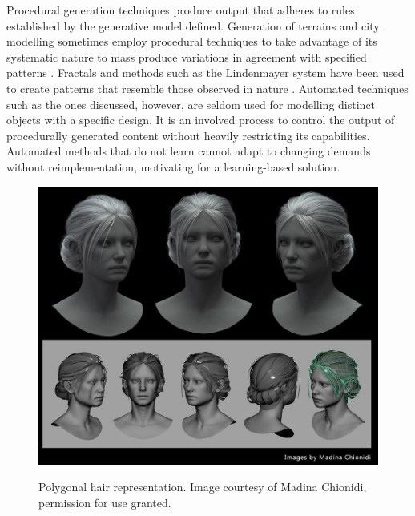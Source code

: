 \documentclass[ %
author={Dillon Keith Diep},
supervisor={Dr. Carl Henrik Ek},
degree={MEng},
title={ART-CG Hair:},
subtitle={Assisted Real-time Content Generation of Stylised Virtual Hair},
type={Research},
year={2017} ]{dissertation}
\begin{document}
Procedural generation techniques produce output that adheres to rules established by the generative model defined. Generation of terrains and city modelling sometimes employ procedural techniques to take advantage of its systematic nature to mass produce variations in agreement with specified patterns \cite{procedural1}. Fractals and methods such as the Lindenmayer system have been used to create patterns that resemble those observed in nature \cite{lsystem}. Automated techniques such as the ones discussed, however, are seldom used for modelling distinct objects with a specific design. It is an involved process to control the output of procedurally generated content without heavily restricting its capabilities. Automated methods that do not learn cannot adapt to changing demands without reimplementation, motivating for a learning-based solution.

\begin{figure}[!h]
	\centering
	\caption{Polygonal hair representation. Image courtesy of Madina Chionidi, permission for use granted.}
	\includegraphics[scale=0.3]{images/hairExemplar}\\
\end{figure}
\end{document}
